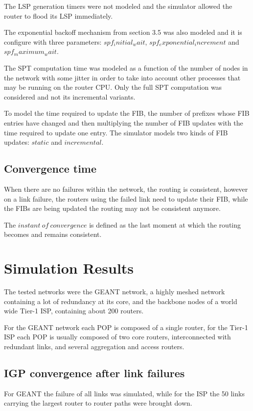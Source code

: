 \documentclass[a4paper, 11pt, UTF8]{article}
\begin{document}
The LSP generation timers were not modeled and the simulator allowed the router to flood its LSP immediately.

The exponential backoff mechanism from section 3.5 was also modeled and it is configure with three parameters: $spf_initial_wait$, $spf_exponential_increment$ and $spf_maximum_wait$.

The SPT computation time was modeled as a function of the number of nodes in the network with some jitter in order to take into account other processes that may be running on the router CPU.
Only the full SPT computation was considered and not its incremental variants.

To model the time required to update the FIB, 
the number of prefixes whose FIB entries have changed and then multiplying the number of FIB updates with the time required to update one entry.
The simulator models two kinds of FIB updates: $static$ and $incremental$.

\subsection{Convergence time}
When there are no failures within the network, the routing is consistent, however on a link failure, the routers using the failed link need to update their FIB, while the FIBs are being updated the routing may not be consistent anymore.

The $instant\ of\ convergence$ is defined as the last moment at which the routing becomes and remains consistent.

\section{Simulation Results}
The tested networks were the GEANT network, a highly meshed network containing a lot of redundancy at its core, 
and the backbone nodes of a world wide Tier-1 ISP, containing about 200 routers.

For the GEANT network each POP is composed of a single router, for the Tier-1 ISP each POP is usually composed of two core routers, interconnected with redundant links, and several aggregation and access routers.

\subsection{IGP convergence after link failures}
For GEANT the failure of all links was simulated, 
while for the ISP the 50 links carrying the largest router to router paths were brought down.
\end{document}
